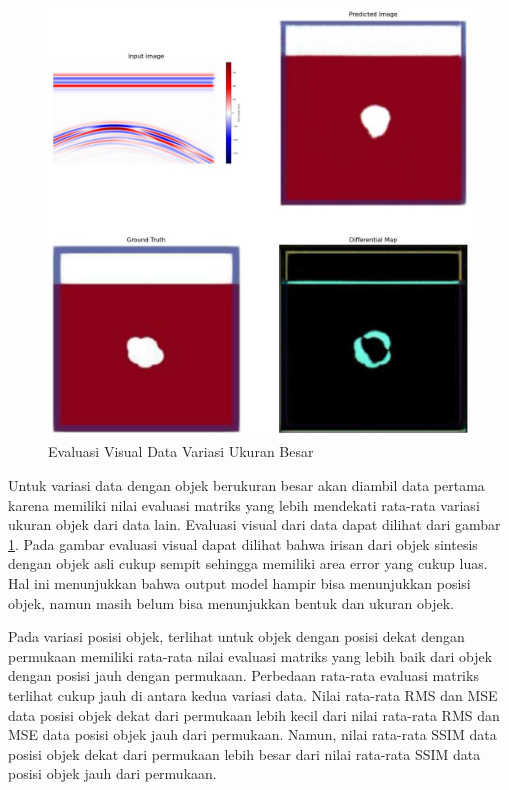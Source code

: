\documentclass[conference]{IEEEtran}
\begin{document}
\begin{figure}[ht]
  \centering
  \includegraphics[scale=0.15]{gambar/diffMapBesar.jpg}
  \caption{Evaluasi Visual Data Variasi Ukuran Besar}
  \label{fig:diffmapbesar}
\end{figure}

Untuk variasi data dengan objek berukuran besar akan diambil data pertama karena memiliki nilai evaluasi matriks yang lebih mendekati rata-rata variasi ukuran objek dari data lain. 
Evaluasi visual dari data dapat dilihat dari gambar \ref{fig:diffmapbesar}. 
Pada gambar evaluasi visual dapat dilihat bahwa irisan dari objek sintesis dengan objek asli cukup sempit sehingga memiliki area error yang cukup luas. 
Hal ini menunjukkan bahwa output model hampir bisa menunjukkan posisi objek, namun masih belum bisa menunjukkan bentuk dan ukuran objek.

Pada variasi posisi objek, terlihat untuk objek dengan posisi dekat dengan permukaan memiliki rata-rata nilai evaluasi matriks yang lebih baik dari objek dengan posisi jauh dengan permukaan.
Perbedaan rata-rata evaluasi matriks terlihat cukup jauh di antara kedua variasi data. 
Nilai rata-rata RMS dan MSE data posisi objek dekat dari permukaan lebih kecil dari nilai rata-rata RMS dan MSE data posisi objek jauh dari permukaan. 
Namun, nilai rata-rata SSIM data posisi objek dekat dari permukaan lebih besar dari nilai rata-rata SSIM data posisi objek jauh dari permukaan. 
\end{document}
